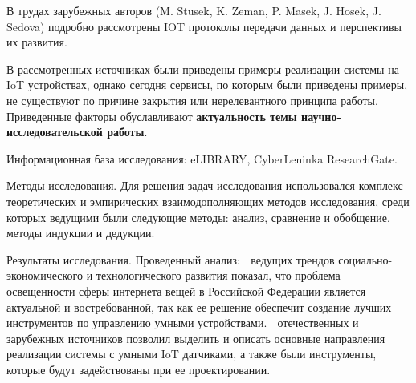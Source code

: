 В трудах зарубежных авторов (M. Stusek, K. Zeman, P. Masek, J. Hosek, J. Sedova) подробно рассмотрены IOT протоколы передачи данных и перспективы их развития.

В рассмотренных источниках были приведены примеры реализации системы на IoT устройствах, однако сегодня сервисы, по которым были приведены примеры, не существуют по причине закрытия или нерелевантного принципа работы. Приведенные факторы обуславливают \textbf{актуальность темы научно-исследовательской работы}.

Информационная база исследования: eLIBRARY, CyberLeninka ResearchGate.

Методы исследования. Для решения задач исследования использовался комплекс теоретических и эмпирических взаимодополняющих методов исследования, среди которых ведущими были следующие методы: анализ, сравнение и обобщение, методы индукции и дедукции.

Результаты исследования. Проведенный анализ:  
	ведущих трендов социально-экономического и технологического развития показал, что проблема освещенности сферы интернета вещей в Российской Федерации является актуальной и востребованной, так как ее решение обеспечит создание лучших инструментов по управлению умными устройствами. 
	отечественных и зарубежных источников позволил выделить и описать основные направления реализации системы с умными IoT датчиками, а также были инструменты, которые будут задействованы при ее проектировании. 

\clearpage
